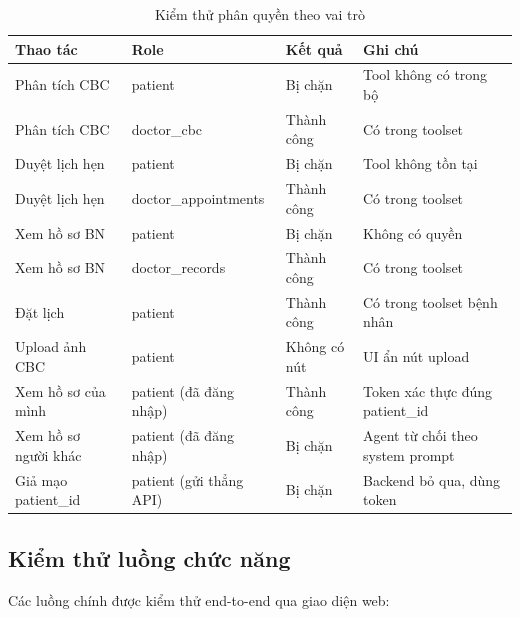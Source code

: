 \documentclass[oneside, a4paper]{book}
\theoremstyle{plain}
\theoremstyle{plain}
\theoremstyle{definition}
\theoremstyle{remark}
\begin{document}
\begin{table}[H]
\centering
\begin{tabular}{|p{4cm}|>{\footnotesize\ttfamily}p{3.8cm}|p{2cm}|p{2.8cm}|}
\hline
\textbf{Thao tác} & \normalfont\textbf{Role} & \textbf{Kết quả} & \textbf{Ghi chú} \\
\hline
Phân tích CBC & patient & Bị chặn & Tool không có trong bộ \\
Phân tích CBC & doctor\_cbc & Thành công & Có trong toolset \\
Duyệt lịch hẹn & patient & Bị chặn & Tool không tồn tại \\
Duyệt lịch hẹn & doctor\_appointments & Thành công & Có trong toolset \\
Xem hồ sơ BN & patient & Bị chặn & Không có quyền \\
Xem hồ sơ BN & doctor\_records & Thành công & Có trong toolset \\
Đặt lịch & patient & Thành công & Có trong toolset bệnh nhân \\
Upload ảnh CBC & patient & Không có nút & UI ẩn nút upload \\
Xem hồ sơ của mình & patient (đã đăng nhập) & Thành công & Token xác thực đúng patient\_id \\
Xem hồ sơ người khác & patient (đã đăng nhập) & Bị chặn & Agent từ chối theo system prompt \\
Giả mạo patient\_id & patient (gửi thẳng API) & Bị chặn & Backend bỏ qua, dùng token \\
\hline
\end{tabular}
\caption{Kiểm thử phân quyền theo vai trò}
\label{tab:role-test}
\end{table}

\subsection{Kiểm thử luồng chức năng}

Các luồng chính được kiểm thử end-to-end qua giao diện web:
\end{document}
